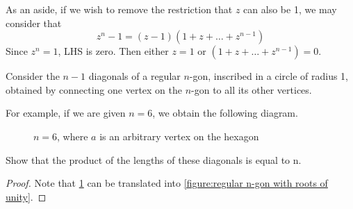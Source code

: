 \documentclass[notoc,notitlepage]{tufte-book}
\begin{document}
As an aside, if we wish to remove the restriction that $z$ can also be 1, we may consider that
\begin{equation*}
	z^n - 1 = (z - 1)(1 + z + \hdots + z^{n - 1})
\end{equation*}
Since $z^n = 1$, LHS is zero. Then either $z = 1$ or $(1 + z + \hdots + z^{n - 1}) = 0$.

\begin{ex}
	Consider the $n - 1$ diagonals of a regular $n$-gon, inscribed in a circle of radius 1, obtained by connecting one vertex on the $n$-gon to all its other vertices.

	For example, if we are given $n = 6$, we obtain the following diagram.

	\begin{figure}
		\begin{center}
		\end{center}
		\caption[loftitle]{$n = 6$, where $a$ is an arbitrary vertex on the hexagon}
		\label{figure:regular hexagon with one point connected to all other vertices}
	\end{figure}

	Show that the product of the lengths of these diagonals is equal to n.

	\begin{proof}
		Note that \cref{figure:regular hexagon with one point connected to all other vertices} can be translated into \cref{figure:regular n-gon with roots of unity}.


\end{proof}
\end{ex}
\end{document}
